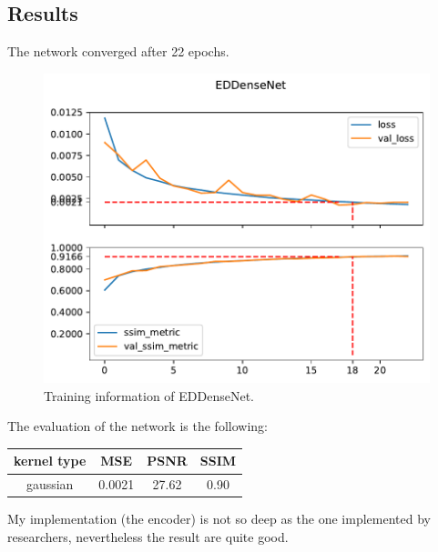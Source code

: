 \subsection{Results}
The network converged after 22 epochs.
\begin{figure}[H]
    \centering
    \includegraphics[height=0.4\textheight,keepaspectratio]{subsections/densenet/plot_history_EDDenseNet.pdf}
    \caption{Training information of EDDenseNet.}
\end{figure}        

The evaluation of the network is the following:

\begin{tabularx}{165pt}{c|ccc}
    \centering
    kernel type & MSE & PSNR & SSIM \\
    \hline
    gaussian & 0.0021 & 27.62 & 0.90
\end{tabularx}

My implementation (the encoder) is not so deep as the one implemented by researchers, nevertheless the result are quite good.

